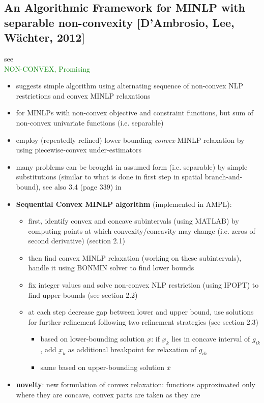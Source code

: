 \documentclass{article}
\begin{document}
\subsection{An Algorithmic Framework for MINLP with separable non-convexity [D'Ambrosio, Lee, W\"achter, 2012]}
\label{sec:SQ-MINLP}
see \cite{d2012algorithmic}\\
\textcolor{green}{NON-CONVEX, Promising}
\begin{itemize}
\item suggests simple algorithm using alternating sequence of non-convex NLP restrictions and convex MINLP relaxations
\item for MINLPs with non-convex objective and constraint functions, but sum of non-convex univariate functions (i.e. separable)
\item employ (repeatedly refined) lower bounding \emph{convex} MINLP relaxation by using piecewise-convex under-estimators
\item many problems can be brought in assumed form (i.e. separable) by simple substitutions (similar to what is done in first step in spatial branch-and-bound), see also 3.4 (page 339) in \cite{d2012algorithmic}
\item \textbf{Sequential Convex MINLP algorithm }(implemented in AMPL):
	\begin{itemize}
	\item first, identify convex and concave subintervals (using MATLAB) by computing points at which convexity/concavity may change (i.e. zeros of second derivative) (section 2.1)
	\item then find convex MINLP relaxation (working on these subintervals), handle it using BONMIN solver to find lower bounds
	\item fix integer values and solve non-convex NLP restriction (using IPOPT) to find upper bounds (see section 2.2)
	\item at each step decrease gap between lower and upper bound, use solutions for further refinement following two refinement strategies (see section 2.3)
		\begin{itemize}
		\item based on lower-bounding solution $\underbar{x}$: if $\underbar{x}_k$ lies in concave interval of $g_{ik}$, add $\underbar{x}_k$ as additional breakpoint for relaxation of $g_{ik}$
		\item same based on upper-bounding solution $\bar{x}$
		\end{itemize}
	\end{itemize}
\item \textbf{novelty}: new formulation of convex relaxation: functions approximated only where they are concave, convex parts are taken as they are

\end{itemize}
\end{document}

